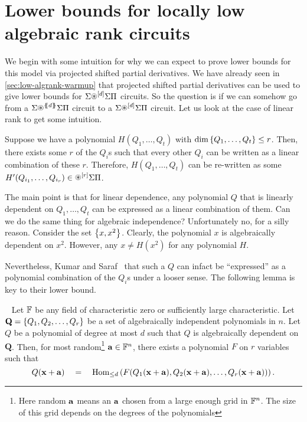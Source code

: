 
\section{Lower bounds for locally low algebraic rank circuits}

We begin with some intuition for why we can expect to prove lower bounds for this model via projected shifted partial derivatives.
We have already seen in \autoref{sec:low-algrank-warmup} that projected shifted partial derivatives can be used to give lower bounds for $\Sigma\circast^{[d]}\Sigma\Pi$ circuits.
So the question is if we can somehow go from a $\SASP{d}$ circuit to a $\Sigma\circast^{[d]}\Sigma\Pi$ circuit.
Let us look at the case of linear rank to get some intuition.

Suppose we have a polynomial $H(Q_1,\ldots, Q_t)$ with $\dim \left\{Q_1,\ldots, Q_t\right\} \leq r$.
Then, there exists some $r$ of the $Q_i$s such that every other $Q_i$ can be written as a linear combination of these $r$.
Therefore, $H(Q_1,\ldots, Q_t)$ can be re-written as some $H'(Q_{i_1}, \ldots, Q_{i_r}) \in \circast^{[r]}\Sigma\Pi$.

The main point is that for linear dependence, any polynomial $Q$ that is linearly dependent on $Q_1,\ldots, Q_t$ can be expressed as a linear combination of them.
Can we do the same thing for algebraic independence?
Unfortunately no, for a silly reason.
Consider the set $\left\{x,x^2\right\}$.
Clearly, the polynomial $x$ is algebraically dependent on $x^2$.
However, any $x \neq H(x^2)$ for any polynomial $H$.

Nevertheless, Kumar and Saraf~\cite{KS16lowrank} that such a $Q$ can infact be ``expressed'' as a polynomial combination of the $Q_i$s under a looser sense.
The following lemma is key to their lower bound.

\begin{lemma}~\label{lem:alg-dep-to-func-dep-tail} Let $\mathbb{F}$ be any field of characteristic zero or sufficiently large characteristic.
Let $\mathbf{Q} = \left\{Q_1, Q_2, \ldots, Q_r\right\}$ be a set of algebraically independent polynomials in $n$.
Let $Q$ be a polynomial of degree at most $d$ such that $Q$ is algebraically dependent on $\mathbf{Q}$.
Then, for most random\footnote{Here random $\mathbf{a}$ means an $\mathbf{a}$ chosen from a large enough grid in $\mathbb{F}^n$.
The size of this grid depends on the degrees of the polynomials} $\mathbf{a} \in \mathbb{F}^{n}$, there exists a polynomial $F$ on $r$ variables such that
\[
Q(\mathbf{x} + \mathbf{a}) \quad = \quad \operatorname{Hom}_{\leq d}\left(F(Q_1(\mathbf{x} + \mathbf{a}), Q_2(\mathbf{x} + \mathbf{a}), \ldots, Q_r(\mathbf{x} + \mathbf{a}))\right).
\]
\end{lemma}


